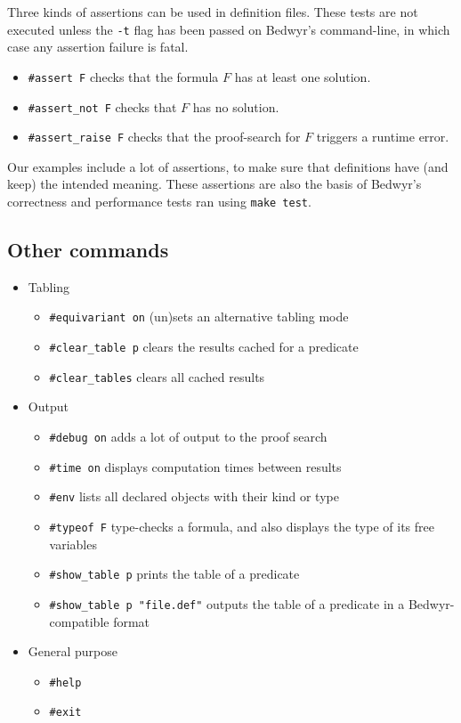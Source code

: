 \documentclass{article}
\begin{document}
Three kinds of assertions can be used in definition files.
These tests are not executed unless the \verb.-t. flag has been passed
on Bedwyr's command-line, in which case any assertion failure is fatal.
\begin{itemize}
\item
\verb.#assert F. checks that the formula $F$ has at least one solution.
\item
\verb.#assert_not F. checks that $F$ has no solution.
\item
\verb.#assert_raise F. checks that the proof-search for $F$ triggers
a runtime error.
\end{itemize}

Our examples include a lot of assertions, to make sure that definitions have
(and keep) the intended meaning. These assertions are also the basis of
Bedwyr's correctness and performance tests ran using \verb.make test..

\subsection{Other commands}
\begin{itemize}
  \item Tabling
    \begin{itemize}
      \item \verb.#equivariant on. (un)sets an alternative tabling mode
      \item \verb.#clear_table p. clears the results cached for a
        predicate
      \item \verb.#clear_tables. clears all cached results
    \end{itemize}

  \item Output
    \begin{itemize}
      \item \verb.#debug on. adds a lot of output to the proof search
      \item \verb.#time on. displays computation times between results
      \item \verb.#env. lists all declared objects with their kind or
        type
      \item \verb.#typeof F. type-checks a formula, and also displays
        the type of its free variables
      \item \verb.#show_table p. prints the table of a predicate
      \item \verb+#show_table p "file.def"+ outputs the table of a
        predicate in a Bedwyr-compatible format
    \end{itemize}

  \item General purpose
    \begin{itemize}
      \item \verb.#help.
      \item \verb.#exit.
    \end{itemize}
\end{itemize}
\end{document}

